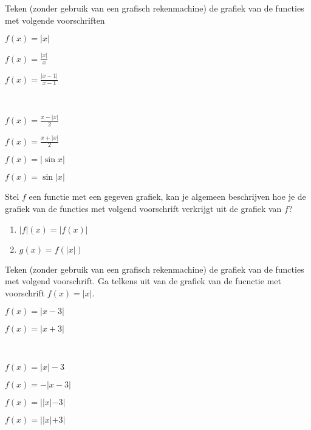 \documentclass{ximera}
\begin{document}
\begin{exercise}
	 Teken (zonder gebruik van een grafisch rekenmachine) de grafiek van de functies met volgende voorschriften

\begin{enumerate}\begin{minipage}[]{0.5\columnwidth}{ \item
			$f(x)=|x|$ \item $\displaystyle f(x)= \frac{|x|}{x}$ \item
			$\displaystyle f(x)= \frac{|x-1|}{x-1}$ }\end{minipage}\ \
	\begin{minipage}[]{0.5\columnwidth}{
			\item $\displaystyle f(x)= \frac{x-|x|}{2}$
			\item $\displaystyle f(x)= \frac{x+|x|}{2}$
			\item $f(x)=|\sin x|$
			\item $f(x)= \sin|x|$}\end{minipage}
\end{enumerate}
\end{exercise}
\begin{exercise}
	 Stel $f$ een functie met een gegeven grafiek, kan je
algemeen beschrijven hoe je de grafiek van de functies met volgend
voorschrift verkrijgt uit de grafiek van $f$?
\begin{enumerate}
	\item $|f|(x)=|f( x)|$
	\item $ g(x)= f(|x|)$
\end{enumerate}
\end{exercise}
\begin{exercise}
	 Teken (zonder gebruik van een grafisch rekenmachine) de grafiek van de functies met volgend voorschrift. Ga
telkens uit van de grafiek van de fucnctie met voorschrift
$f(x)=|x|$.
\\\begin{enumerate}\begin{minipage}[]{0.33\columnwidth}{ \item
			$f(x)=|x-3|$ \item $f(x)=|x+3|$}\end{minipage}\ \
	\begin{minipage}[]{0.33\columnwidth}{
			\item $f(x)=|x|-3$
			\item $f(x)=-|x-3|$}\end{minipage}
	\begin{minipage}[]{0.33\columnwidth}{
			\item $f(x)=||x|-3|$ \item $f(x)=||x|+3|$}\end{minipage}
\end{enumerate}
\end{exercise}
\end{document}
